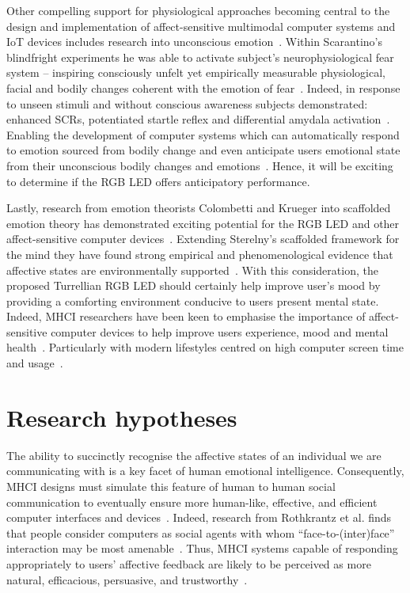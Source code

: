 \documentclass{sigchi}
\begin{document}
Other compelling support for physiological approaches becoming central to the design and implementation of affect-sensitive multimodal computer systems and IoT devices includes research into unconscious emotion~\cite{scarantino2010insights, winkielman2004unconscious}. Within Scarantino’s blindfright experiments he was able to activate subject’s neurophysiological fear system – inspiring consciously unfelt yet empirically measurable physiological, facial and bodily changes coherent with the emotion of fear~\cite{scarantino2010insights}. Indeed, in response to unseen stimuli and without conscious awareness subjects demonstrated: enhanced SCRs, potentiated startle reflex and differential amydala activation~\cite{scarantino2010insights, winkielman2004unconscious}. Enabling the development of computer systems which can automatically respond to emotion sourced from bodily change and even anticipate users emotional state from their unconscious bodily changes and emotions~\cite{scarantino2010insights, smith2016unconscious}. Hence, it will be exciting to determine if the RGB LED offers anticipatory performance.

Lastly, research from emotion theorists Colombetti and Krueger into scaffolded emotion theory has demonstrated exciting potential for the RGB LED and other affect-sensitive computer devices~\cite{colombetti2015scaffoldings}. Extending Sterelny’s scaffolded framework for the mind they have found strong empirical and phenomenological evidence that affective states are environmentally supported~\cite{sterelny2010minds, sterelny2004externalism}. With this consideration, the proposed Turrellian RGB LED should certainly help improve user’s mood by providing a comforting environment conducive to users present mental state. Indeed, MHCI researchers have been keen to emphasise the importance of affect-sensitive computer devices to help improve users experience, mood and mental health~\cite{de2013predicting, fitriani2007multimodal, 5771346}. Particularly with modern lifestyles centred on high computer screen time and usage~\cite{MedicalNews03, MedicalNews01, MedicalNews02}. 

\section{Research hypotheses}

The ability to succinctly recognise the affective states of an individual we are communicating with is a key facet of human emotional intelligence. Consequently, MHCI designs must simulate this feature of human to human social communication to eventually ensure more human-like, effective, and efficient computer interfaces and devices~\cite{fitriani2007multimodal}. Indeed, research from Rothkrantz et al. finds that people consider computers as social agents with whom “face-to-(inter)face” interaction may be most amenable~\cite{pantic2003toward}. Thus, MHCI systems capable of responding appropriately to users’ affective feedback are likely to be perceived as more natural, efficacious, persuasive, and trustworthy~\cite{pantic2003toward}.
\end{document}
